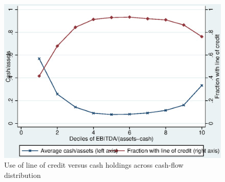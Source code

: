 \documentclass{article}
\begin{document}

\setcounter{table}{2}

\begin{figure}
 \caption{\label{fig2}Use of line of credit versus cash holdings across cash-flow distribution}
 \includegraphics{../tmp/figure_1.eps} 
\end{figure}
\end{document}

